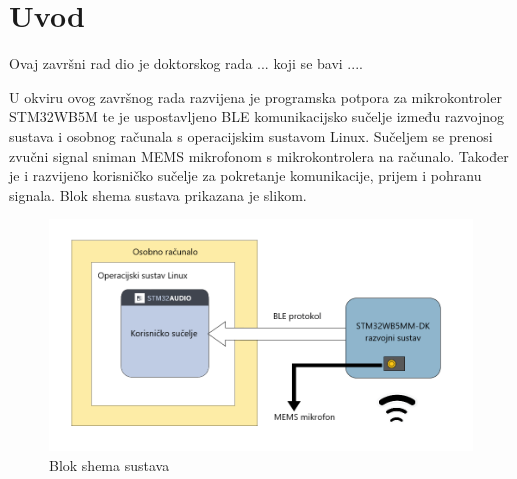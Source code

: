\chapter{Uvod}


Ovaj završni rad dio je doktorskog rada ... koji se bavi .... 

U okviru ovog završnog rada razvijena je programska potpora za mikrokontroler STM32WB5M te je uspostavljeno BLE komunikacijsko sučelje između razvojnog sustava i osobnog računala s operacijskim sustavom Linux. Sučeljem se prenosi zvučni signal sniman MEMS mikrofonom s mikrokontrolera na računalo. Također je i razvijeno korisničko sučelje za pokretanje komunikacije, prijem i pohranu signala. Blok shema sustava prikazana je slikom. 

\begin{figure}[ht]
	\includegraphics[width=\linewidth]{imgs/shema}
	\caption{Blok shema sustava}
	 \label{fig:shema}
\end{figure}

\cite{signalprocessing}
\eject